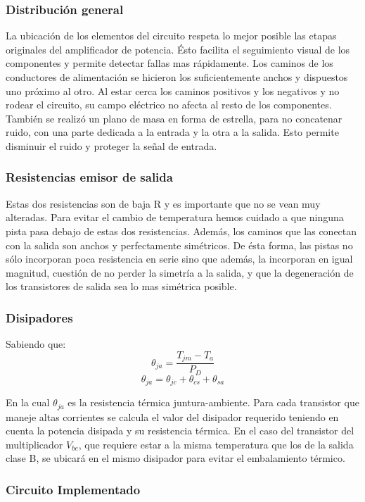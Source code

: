 \subsubsection*{Distribución general}
La ubicación de los elementos del circuito respeta lo mejor posible las etapas originales del amplificador de potencia. Ésto facilita el seguimiento visual de los componentes y permite detectar fallas mas rápidamente.
Los caminos de los conductores de alimentación se hicieron los suficientemente anchos y dispuestos uno próximo al otro. Al estar cerca los caminos positivos y los negativos y no rodear el circuito, su campo eléctrico no afecta al resto de los componentes.
También se realizó un plano de masa en forma de estrella, para no concatenar ruido, con una parte dedicada a la entrada y la otra a la salida. Esto permite disminuir el ruido y proteger la señal de entrada.



\subsubsection*{Resistencias emisor de salida}
Estas dos resistencias son de baja R y es importante que no se vean muy alteradas. Para evitar el cambio de temperatura hemos cuidado a que ninguna pista pasa debajo de estas dos resistencias. Además, los caminos que las conectan con la salida son anchos y perfectamente simétricos. De ésta forma, las pistas no sólo incorporan poca resistencia en serie sino que además, la incorporan en igual magnitud, cuestión de no perder la simetría a la salida, y que la degeneración de los transistores de salida sea lo mas simétrica posible.

\subsubsection{Disipadores}
\bigskip
Sabiendo que:
$$
   \theta_{ja}=\dfrac{T_{jm}-T_a}{P_D}
$$
$$
	\theta_{ja}=\theta_{jc}+\theta_{cs}+\theta_{sa}
$$

En la cual $\theta_{ja}$ es la resistencia térmica juntura-ambiente. Para cada transistor que maneje altas corrientes se calcula el valor del disipador requerido teniendo en cuenta la potencia disipada y su resistencia térmica. En el caso del transistor del multiplicador $V_{be}$, que requiere estar a la misma temperatura que los de la salida clase B, se ubicará en el mismo disipador para evitar el embalamiento térmico.

\subsubsection{Circuito Implementado}

